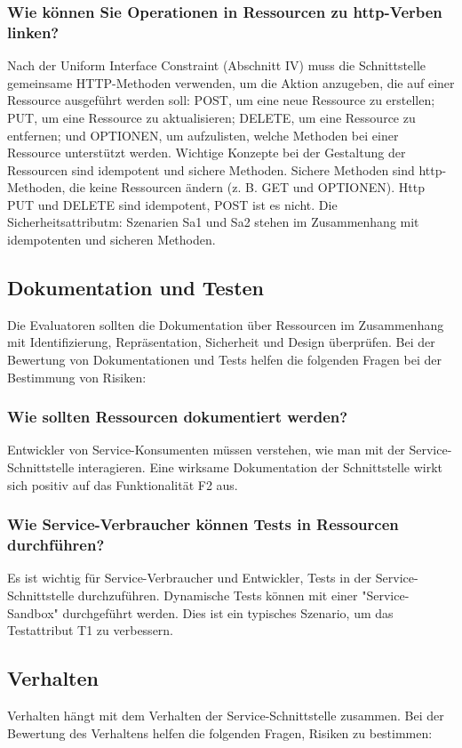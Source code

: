\documentclass{acmsiggraph}
\begin{document}
\subsubsection{Wie können Sie Operationen in Ressourcen zu http-Verben linken?}
Nach der Uniform Interface Constraint (Abschnitt IV) muss die Schnittstelle gemeinsame HTTP-Methoden verwenden, um die Aktion anzugeben, die auf einer Ressource ausgeführt werden soll: POST, um eine neue Ressource zu erstellen; PUT, um eine Ressource zu aktualisieren; DELETE, um eine Ressource zu entfernen; und OPTIONEN, um aufzulisten, welche Methoden bei einer Ressource unterstützt werden.
Wichtige Konzepte bei der Gestaltung der Ressourcen sind idempotent und sichere Methoden.
Sichere Methoden sind http-Methoden, die keine Ressourcen ändern (z. B. GET und OPTIONEN).
Http PUT und DELETE sind idempotent, POST ist es nicht. Die Sicherheitsattributm: Szenarien Sa1 und Sa2 stehen im Zusammenhang mit idempotenten und sicheren Methoden.
\subsection{Dokumentation und Testen}
Die Evaluatoren sollten die Dokumentation über Ressourcen im Zusammenhang mit Identifizierung, Repräsentation, Sicherheit und Design überprüfen.
Bei der Bewertung von Dokumentationen und Tests helfen die folgenden Fragen bei der Bestimmung von Risiken:
\subsubsection{Wie sollten Ressourcen dokumentiert werden?}
Entwickler von Service-Konsumenten müssen verstehen, wie man mit der Service-Schnittstelle interagieren.
Eine wirksame Dokumentation der Schnittstelle wirkt sich positiv auf das Funktionalität F2 aus.
\subsubsection{Wie Service-Verbraucher können Tests in Ressourcen durchführen?}
Es ist wichtig für Service-Verbraucher und Entwickler, Tests in der Service-Schnittstelle durchzuführen.
Dynamische Tests können mit einer "Service-Sandbox" durchgeführt werden.
Dies ist ein typisches Szenario, um das Testattribut T1 zu verbessern.

\subsection{Verhalten}
Verhalten hängt mit dem Verhalten der Service-Schnittstelle zusammen.
Bei der Bewertung des Verhaltens helfen die folgenden Fragen, Risiken zu bestimmen:
\end{document}
